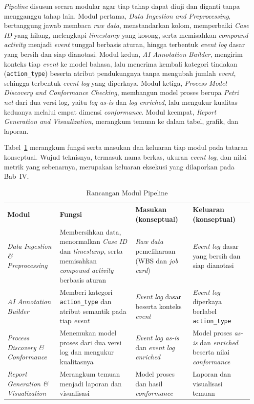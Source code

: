 \textit{Pipeline} disusun secara modular agar tiap tahap dapat diuji dan diganti tanpa mengganggu tahap lain. Modul pertama, \textit{Data Ingestion and Preprocessing}, bertanggung jawab membaca \textit{raw data}, menstandarkan kolom, memperbaiki \textit{Case ID} yang hilang, melengkapi \textit{timestamp} yang kosong, serta memisahkan \textit{compound activity} menjadi \textit{event} tunggal berbasis aturan, hingga terbentuk \textit{event log} dasar yang bersih dan siap dianotasi. Modul kedua, \textit{AI Annotation Builder}, mengirim konteks tiap \textit{event} ke model bahasa, lalu menerima kembali kategori tindakan (\texttt{action\_type}) beserta atribut pendukungnya tanpa mengubah jumlah \textit{event}, sehingga terbentuk \textit{event log} yang diperkaya. Modul ketiga, \textit{Process Model Discovery and Conformance Checking}, membangun model proses berupa \textit{Petri net} dari dua versi log, yaitu \textit{log as-is} dan \textit{log enriched}, lalu mengukur kualitas keduanya melalui empat dimensi \textit{conformance}. Modul keempat, \textit{Report Generation and Visualization}, merangkum temuan ke dalam tabel, grafik, dan laporan.

Tabel~\ref{tab:rancangan-modul-pipeline} merangkum fungsi serta masukan dan keluaran tiap modul pada tataran konseptual. Wujud teknisnya, termasuk nama berkas, ukuran \textit{event log}, dan nilai metrik yang sebenarnya, merupakan keluaran eksekusi yang dilaporkan pada Bab~IV.

\begin{table}[H]
\centering
\caption{Rancangan Modul Pipeline}
\label{tab:rancangan-modul-pipeline}
\footnotesize
\begin{tabularx}{\textwidth}{p{3cm} p{3.2cm} X X}
\toprule
\textbf{Modul} & \textbf{Fungsi} & \textbf{Masukan (konseptual)} & \textbf{Keluaran (konseptual)} \\
\midrule
\textit{Data Ingestion \& Preprocessing} &
Membersihkan data, menormalkan \textit{Case ID} dan \textit{timestamp}, serta memisahkan \textit{compound activity} berbasis aturan &
\textit{Raw data} pemeliharaan (WBS dan \textit{job card}) &
\textit{Event log} dasar yang bersih dan siap dianotasi \\
\addlinespace
\textit{AI Annotation Builder} &
Memberi kategori \texttt{action\_type} dan atribut semantik pada tiap \textit{event} &
\textit{Event log} dasar beserta konteks \textit{event} &
\textit{Event log} diperkaya berlabel \texttt{action\_type} \\
\addlinespace
\textit{Process Discovery \& Conformance} &
Menemukan model proses dari dua versi log dan mengukur kualitasnya &
\textit{Event log as-is} dan \textit{event log enriched} &
Model proses \textit{as-is} dan \textit{enriched} beserta nilai \textit{conformance} \\
\addlinespace
\textit{Report Generation \& Visualization} &
Merangkum temuan menjadi laporan dan visualisasi &
Model proses dan hasil \textit{conformance} &
Laporan dan visualisasi temuan \\
\bottomrule
\end{tabularx}
\end{table}


